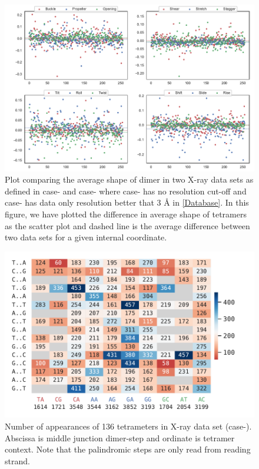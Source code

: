 \begin{figure}
	\begin{center}
	\includegraphics[scale=0.8]{./Xray_images/muTX2-muTX3_diff_compare_res.pdf}
	\caption{Plot comparing the average shape of dimer in two X-ray data sets as defined in case- and case- where case- has no resolution cut-off and case- has data only resolution better that 3 \AA \; in \cref{Database}. In this figure, we have plotted the difference in average shape of tetramers as the scatter plot and dashed line is the average difference between two data sets for a given internal coordinate.}
\label{SIfig:tet_diff_res_compare}
\end{center}
\end{figure}



\begin{figure}[H]
	\begin{center}
	\includegraphics[scale=0.75]{./Xray_images/freq_heat_map_tt2_3S_C1_cg_unsym.pdf}
	\caption{Number of appearances of 136 tetrameters in X-ray  data set (case-). Abscissa is middle junction dimer-step and ordinate is tetramer context. Note that the palindromic steps are only read from reading strand.}
\label{SIfig:freq}
\end{center}
\end{figure}

